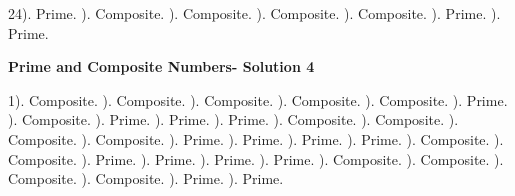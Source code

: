 \documentclass{article}%
\begin{document}
24). Prime.%
). Composite.%
). Composite.%
). Composite.%
). Composite.%
). Prime.%
). Prime.%
\newline%
\newpage%
\large%
\begin{center}%
\textbf{Prime and Composite Numbers- Solution 4}%
\newline%
\end{center} \normalsize%
1). Composite.%
). Composite.%
). Composite.%
). Composite.%
). Composite.%
). Prime.%
). Composite.%
). Prime.%
). Prime.%
). Prime.%
). Composite.%
). Composite.%
). Composite.%
). Composite.%
). Prime.%
). Prime.%
). Prime.%
). Prime.%
). Composite.%
). Composite.%
). Prime.%
). Prime.%
). Prime.%
). Prime.%
). Composite.%
). Composite.%
). Composite.%
). Composite.%
). Prime.%
). Prime.%
\newline%
\end{document}
